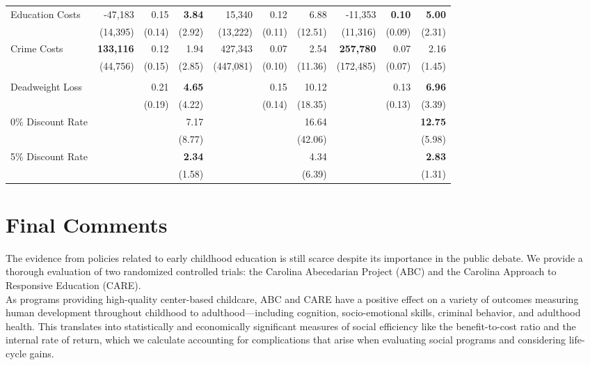 {\begin{tabular}{l r r r r r r r r r}
Education Costs	&	-47,183	&	0.15	&	\textbf{3.84}	&	15,340	&	0.12	&	6.88	&	-11,353	&	\textbf{0.10}	&	\textbf{5.00}	\\
	&	(14,395)	&	(0.14)	&	(2.92)	&	(13,222)	&	(0.11)	&	(12.51)	&	(11,316)	&	(0.09)	&	(2.31)	\\
Crime Costs	&	\textbf{133,116}	&	0.12	&	1.94	&	427,343	&	0.07	&	2.54	&	\textbf{257,780}	&	0.07	&	2.16	\\
	&	(44,756)	&	(0.15)	&	(2.85)	&	(447,081)	&	(0.10)	&	(11.36)	&	(172,485)	&	(0.07)	&	(1.45)	\\ \\
Deadweight Loss	&		&	0.21	&	\textbf{4.65}	&		&	0.15	&	10.12	&		&	0.13	&	\textbf{6.96}	\\
	&		&	(0.19)	&	(4.22)	&		&	(0.14)	&	(18.35)	&		&	(0.13)	&	(3.39)	\\
0\% Discount Rate	&		&		&	7.17	&		&		&	16.64	&		&		&	\textbf{12.75}	\\
	&		&		&	(8.77)	&		&		&	(42.06)	&		&		&	(5.98)	\\
5\% Discount Rate	&		&		&	\textbf{2.34}	&		&		&	4.34	&		&		&	\textbf{2.83}	\\
	&		&		&	(1.58)	&		&		&	(6.39)	&		&		&	(1.31)	\\
	
	

\bottomrule
\end{tabular}}

\section{Final Comments} \label{section:conclusion}

\noindent The evidence from policies related to early childhood education is still scarce despite its importance in the public debate. We provide a thorough evaluation of two randomized controlled trials: the Carolina Abecedarian Project (ABC) and the Carolina Approach to Responsive Education (CARE).\\ 

\noindent As programs providing high-quality center-based childcare, ABC and CARE have a positive effect on a variety of outcomes measuring human development throughout childhood to adulthood---including cognition, socio-emotional skills, criminal behavior, and adulthood health. This translates into statistically and economically significant measures of social efficiency like the benefit-to-cost ratio and the internal rate of return, which we calculate accounting for complications that arise when evaluating social programs and considering life-cycle gains.\\

